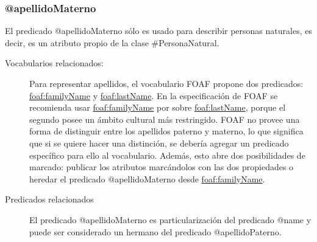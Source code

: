 \subsubsection{@apellidoMaterno}

El predicado @apellidoMaterno sólo es usado para describir personas
naturales, es decir, es un atributo propio de la clase
\#PersonaNatural.

\begin{description}
  
\item[{\sf Vocabularios relacionados:}]
  Para representar apellidos, el vocabulario FOAF propone dos
  predicados:
  \url{foaf:familyName} y \url{foaf:lastName}. En la especificación de
  FOAF se recomienda usar \url{foaf:familyName} por sobre
  \url{foaf:lastName}, porque el segundo posee un ámbito cultural más
  restringido. FOAF no provee una forma de distinguir entre los
  apellidos paterno y materno, lo que significa que si se quiere hacer
  una distinción, se debería agregar un predicado específico para ello
  al vocabulario. Además, esto abre dos posibilidades de marcado:
  publicar los atributos marcándolos con las dos propiedades o heredar
  el predicado @apellidoMaterno desde \url{foaf:familyName}.
\item[{\sf Predicados relacionados}]
  El predicado @apellidoMaterno es particularización del
  predicado @name y puede ser considerado un hermano del predicado
  @apellidoPaterno.
\end{description}

